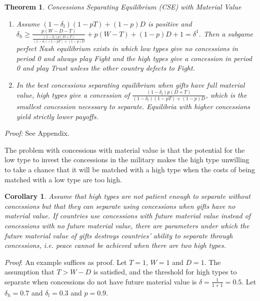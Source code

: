 \documentclass[12pt, letterpaper]{article}
\newcommand{\de}{\delta}
\newtheorem{theorem}{Theorem}
\newtheorem{corollary}{Corollary}
\begin{document}
\begin{theorem}
\emph{Concessions Separating Equilibrium (CSE) with Material Value}
	\begin{enumerate}
		\item[(a)] Assume $\left(1-\de_l\right)\left(1 - pT \right) + (1-p) D$ is positive and $\de_h \geq \frac{p(W-D-T)}{\frac{\left(1-\de_l\right)p\left(D +	 T\right)}{\left(1-\de_l\right)\left(1 - pT \right) + (1-p) D}} + p (W-T) + (1-p)D + 1 = \de^{1}$. Then a subgame perfect Nash equilibrium exists in which low types give no concessions in period 0 and always play Fight and the high types give a concession in period 0 and play Trust unless the other country defects to Fight.
		\item[(b)] In the best concessions separating equilibrium when gifts have full material value, high types give a concession of $\frac{\left(1-\de_l\right)p\left(D + T\right)}{\left(1-\de_l\right)\left(1 - pT \right) + (1-p) D}$, which is the smallest concession necessary to separate. Equilibria with higher concessions yield strictly lower payoffs.
\end{enumerate}
	\label{theorem:csemv}
\end{theorem}
\emph{Proof:} See Appendix.

The problem with concessions with material value is that the potential for the low type to invest the concessions in the military makes the high type unwilling to take a chance that it will be matched with a high type when the costs of being matched with a low type are too high.

\begin{corollary}
	Assume that high types are not patient enough to separate without concessions but that they can separate using concessions when gifts have no material value. If countries use concessions with future material value instead of concessions with no future material value, there are parameters under which the future material value of gifts destroys countries' ability to separate through concessions, i.e. peace cannot be achieved when there are two high types.
	\label{corollary:matval}
\end{corollary}

\emph{Proof}: An example suffices as proof. Let $T = 1$, $W=1$ and $D = 1$. The assumption that $T > W - D$ is satisfied, and the threshold for high types to separate when concessions do not have future material value is $\de = \frac{1}{1+1} = 0.5$. Let $\de_h = 0.7$ and $\de_l = 0.3$ and $p = 0.9$.
\end{document}
